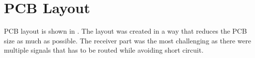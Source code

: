 \section{PCB Layout}

PCB layout is shown in . The layout was created in a way that reduces the PCB size as much as possible.
The receiver part was the most challenging as there were multiple signals that has to be routed while avoiding short circuit.
\vspace*{.5cm}

